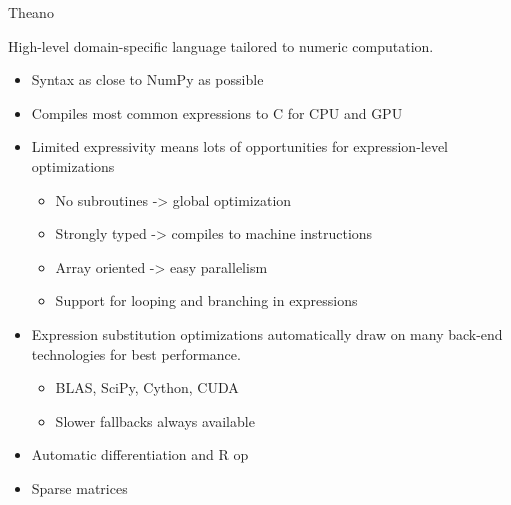 \documentclass[utf8x,xcolor=pdftex,dvipsnames,table]{beamer}
\begin{document}

\begin{frame}{Theano}

High-level domain-specific language tailored to numeric computation.

\begin{itemize}
  \item Syntax as close to NumPy as possible
  \item Compiles most common expressions to C for CPU and GPU
  \item Limited expressivity means lots of opportunities for expression-level optimizations
  \begin{itemize}
    \item No subroutines -> global optimization
    \item Strongly typed -> compiles to machine instructions
    \item Array oriented -> easy parallelism
    \item Support for looping and branching in expressions
  \end{itemize}
  \item Expression substitution optimizations automatically draw
  on many back-end technologies for best performance.
  \begin{itemize}
    \item BLAS, SciPy, Cython, CUDA
    \item Slower fallbacks always available
  \end{itemize}
  \item Automatic differentiation and R op

  \item Sparse matrices
\end{itemize}
\end{frame}
\end{document}
